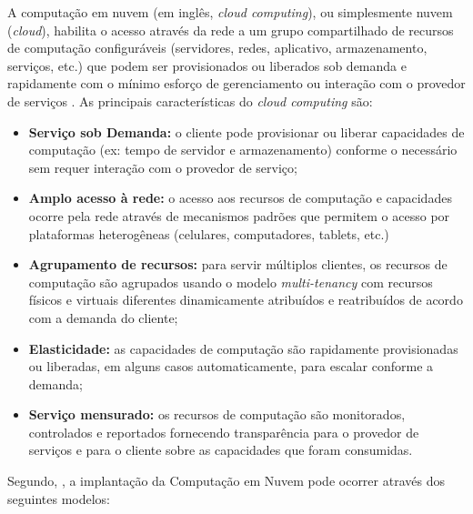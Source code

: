 A computação em nuvem (em inglês, \emph{cloud computing}), ou simplesmente nuvem
(\emph{cloud}), habilita o acesso através da rede a um grupo compartilhado de
recursos de computação configuráveis (servidores, redes, aplicativo,
armazenamento, serviços, etc.) que podem ser provisionados ou liberados sob
demanda e rapidamente com o mínimo esforço de gerenciamento ou interação com o
provedor de serviços \cite{NIST2011}. As principais características do
\emph{cloud computing} são:


\begin{itemize}
    
    \item \textbf{Serviço sob Demanda:} o cliente pode provisionar ou liberar
    capacidades de computação (ex: tempo de servidor e armazenamento) conforme o
    necessário sem requer interação com o provedor de serviço;
    
    \item \textbf{Amplo acesso à rede:} o acesso aos recursos de computação e
    capacidades ocorre pela rede através de mecanismos padrões que permitem o
    acesso por plataformas heterogêneas (celulares, computadores, tablets, etc.)
      
    \item \textbf{Agrupamento de recursos:} para servir múltiplos clientes, os
    recursos de computação são agrupados usando o modelo \emph{multi-tenancy}
    com recursos físicos e virtuais diferentes dinamicamente atribuídos e
    reatribuídos de acordo com a demanda do cliente;
    
    \item \textbf{Elasticidade:} as capacidades de computação são rapidamente
    provisionadas ou liberadas, em alguns casos automaticamente, para escalar
    conforme a demanda;
    
    \item \textbf{Serviço mensurado:} os recursos de computação são monitorados,
    controlados e reportados fornecendo transparência para o provedor de
    serviços e para o cliente sobre as capacidades que foram consumidas.

\end{itemize}

Segundo, , a implantação da Computação em Nuvem pode
ocorrer através dos seguintes modelos:

